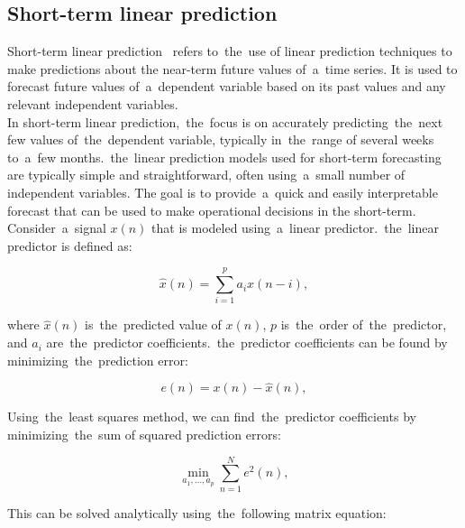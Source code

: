 \subsection{Short-term linear prediction} \label{subsec:shortlp}

Short-term linear prediction~\cite{Riahy} refers to~the~use of linear prediction techniques to make predictions about
the near-term future values of~a~time series. It is used to forecast future values of~a~dependent variable based on
its past values and any relevant independent variables.
\\
In short-term linear prediction,~the~focus is on accurately predicting~the~next few values of~the~dependent variable,
typically in~the~range of several weeks to~a~few months.~the~linear prediction models used for short-term
forecasting are typically simple and straightforward, often using~a~small number of independent variables.
The goal is to provide~a~quick and easily interpretable forecast that can be used to make operational decisions in
the short-term.
Consider~a~signal $x(n)$ that is modeled using~a~linear predictor.~the~linear predictor is defined as:

\begin{equation}
  \hat{x}(n) = \sum_{i=1}^{p} a_i x(n-i),
  \label{eq:linear-predictor}
\end{equation}

where $\hat{x}(n)$ is~the~predicted value of $x(n)$, $p$ is~the~order of~the~predictor, and $a_i$ are~the~predictor coefficients.~the~predictor coefficients can be found by minimizing~the~prediction error:

\begin{equation}
  e(n) = x(n) - \hat{x}(n),
  \label{eq:prediction-error}
\end{equation}

Using~the~least squares method, we can find~the~predictor coefficients by minimizing~the~sum of squared prediction errors:

\begin{equation}
  \min_{a_1,\dots,a_p} \sum_{n=1}^{N} e^2(n),
  \label{eq:least-squares}
\end{equation}

This can be solved analytically using~the~following matrix equation:

